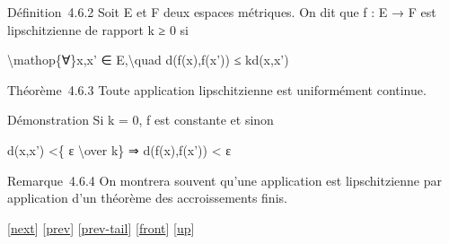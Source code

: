 \documentclass[]{article}
\begin{document}
Définition~4.6.2 Soit E et F deux espaces métriques. On dit que f : E →
F est lipschitzienne de rapport k ≥ 0 si

\textbackslash{}mathop\{∀\}x,x' ∈ E,\textbackslash{}quad d(f(x),f(x')) ≤
kd(x,x')

Théorème~4.6.3 Toute application lipschitzienne est uniformément
continue.

Démonstration Si k = 0, f est constante et sinon

d(x,x') \textless{}\{ ε \textbackslash{}over k\} ⇒ d(f(x),f(x'))
\textless{} ε

Remarque~4.6.4 On montrera souvent qu'une application est lipschitzienne
par application d'un théorème des accroissements finis.

{[}\href{coursse24.html}{next}{]} {[}\href{coursse22.html}{prev}{]}
{[}\href{coursse22.html\#tailcoursse22.html}{prev-tail}{]}
{[}\href{coursse23.html}{front}{]}
{[}\href{coursch5.html\#coursse23.html}{up}{]}
\end{document}
